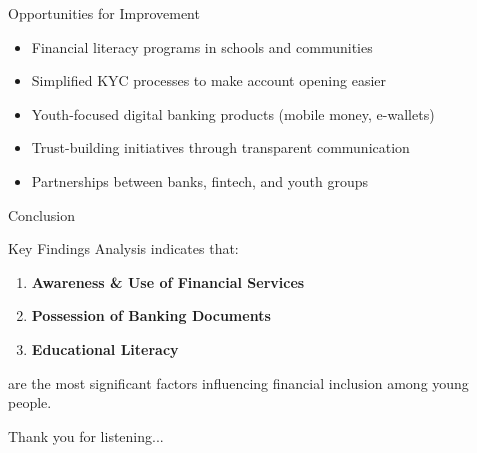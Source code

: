\documentclass{beamer}
\begin{document}
\begin{frame}{Opportunities for Improvement}
\begin{itemize}
    \item Financial literacy programs in schools and communities
    \item Simplified KYC processes to make account opening easier
    \item Youth-focused digital banking products (mobile money, e-wallets)
    \item Trust-building initiatives through transparent communication
    \item Partnerships between banks, fintech, and youth groups
\end{itemize}
\end{frame}

\begin{frame}{Conclusion}
\begin{block}{Key Findings}
Analysis indicates that:
\begin{enumerate}
    \item \textbf{Awareness \& Use of Financial Services}
    \item \textbf{Possession of Banking Documents}
    \item \textbf{Educational Literacy}
\end{enumerate}
are the most significant factors influencing financial inclusion among young people.
\end{block}
\end{frame}

\begin{frame}
\begin{block}{}
\begin{center}
Thank you for listening...
\end{center}
\end{block}
\end{frame}
\end{document}
